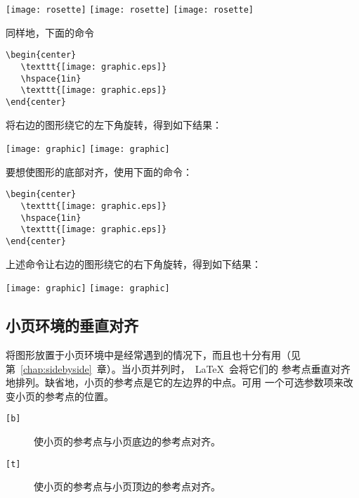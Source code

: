 \begin{center}
   \texttt{[image: rosette]}
   \texttt{[image: rosette]}
   \texttt{[image: rosette]}
\end{center}
同样地，下面的命令

\begin{Verbatim}[xleftmargin=1cm]
\begin{center}
   \texttt{[image: graphic.eps]}
   \hspace{1in}
   \texttt{[image: graphic.eps]}
\end{center}
\end{Verbatim}
将右边的图形绕它的左下角旋转，得到如下结果：

\begin{center}
   \texttt{[image: graphic]}
   \hspace{1in}
   \texttt{[image: graphic]}
\end{center}
要想使图形的底部对齐，使用下面的命令：

\begin{Verbatim}[xleftmargin=1cm]
\begin{center}
   \texttt{[image: graphic.eps]}
   \hspace{1in}
   \texttt{[image: graphic.eps]}
\end{center}
\end{Verbatim}
上述命令让右边的图形绕它的右下角旋转，得到如下结果：

\begin{center}
   \texttt{[image: graphic]}
   \hspace{1in}
   \texttt{[image: graphic]}
\end{center}

\subsection{小页环境的垂直对齐}\label{ssec:minivalign}

将图形放置于小页环境中是经常遇到的情况下，而且也十分有用（见
第~\ref{chap:sidebyside}~章）。当小页并列时，~\LaTeX{}~会将它们的
参考点垂直对齐地排列。缺省地，小页的参考点是它的左边界的中点。可用
一个可选参数项来改变小页的参考点的位置。

\begin{description}
\item[\texttt{[b]}] 使小页的参考点与小页底边的参考点对齐。
\item[\texttt{[t]}] 使小页的参考点与小页顶边的参考点对齐。
\end{description}

